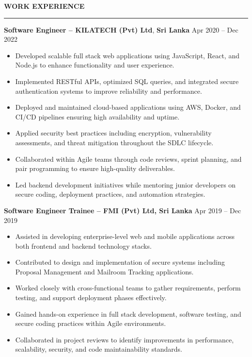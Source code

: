 \documentclass[10pt,letterpaper]{article}
\begin{document}
\vspace{8pt}

\textbf{WORK EXPERIENCE}\\[-8pt]
\noindent\rule{\textwidth}{1pt}

\vspace{-2pt}

\textbf{Software Engineer -- KILATECH (Pvt) Ltd}, \textbf{Sri Lanka} \hfill Apr 2020 -- Dec 2022

\vspace{-1pt}

\begin{itemize}
\item Developed scalable full stack web applications using JavaScript, React, and Node.js to enhance functionality and user experience.
\item Implemented RESTful APIs, optimized SQL queries, and integrated secure authentication systems to improve reliability and performance.
\item Deployed and maintained cloud-based applications using AWS, Docker, and CI/CD pipelines ensuring high availability and uptime.
\item Applied security best practices including encryption, vulnerability assessments, and threat mitigation throughout the SDLC lifecycle.
\item Collaborated within Agile teams through code reviews, sprint planning, and pair programming to ensure high-quality deliverables.
\item Led backend development initiatives while mentoring junior developers on secure coding, deployment practices, and automation strategies.
\end{itemize}

\textbf{Software Engineer Trainee -- FMI (Pvt) Ltd, Sri Lanka} \hfill Apr 2019 -- Dec 2019

\vspace{-1pt}

\begin{itemize}
\item Assisted in developing enterprise-level web and mobile applications across both frontend and backend technology stacks.
\item Contributed to design and implementation of secure systems including Proposal Management and Mailroom Tracking applications.
\item Worked closely with cross-functional teams to gather requirements, perform testing, and support deployment phases effectively.
\item Gained hands-on experience in full stack development, software testing, and secure coding practices within Agile environments.
\item Collaborated in project reviews to identify improvements in performance, scalability, security, and code maintainability standards.
\end{itemize}
\end{document}
